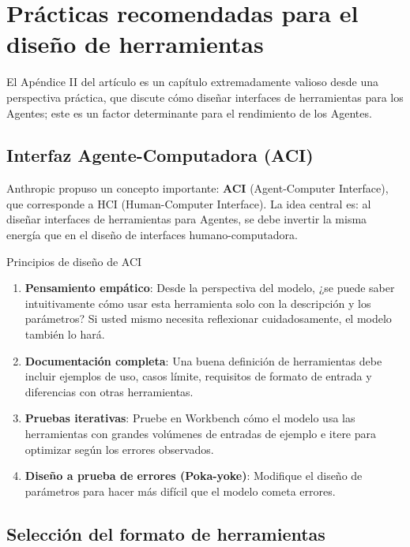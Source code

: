 \section{Prácticas recomendadas para el diseño de herramientas}

El Apéndice II del artículo es un capítulo extremadamente valioso desde una perspectiva práctica, que discute cómo diseñar interfaces de herramientas para los Agentes; este es un factor determinante para el rendimiento de los Agentes.

\subsection{Interfaz Agente-Computadora (ACI)}

Anthropic propuso un concepto importante: \textbf{ACI} (Agent-Computer Interface), que corresponde a HCI (Human-Computer Interface). La idea central es: al diseñar interfaces de herramientas para Agentes, se debe invertir la misma energía que en el diseño de interfaces humano-computadora.

\begin{importantbox}{Principios de diseño de ACI}
\begin{enumerate}
    \item \textbf{Pensamiento empático}: Desde la perspectiva del modelo, ¿se puede saber intuitivamente cómo usar esta herramienta solo con la descripción y los parámetros? Si usted mismo necesita reflexionar cuidadosamente, el modelo también lo hará.
    \item \textbf{Documentación completa}: Una buena definición de herramientas debe incluir ejemplos de uso, casos límite, requisitos de formato de entrada y diferencias con otras herramientas.
    \item \textbf{Pruebas iterativas}: Pruebe en Workbench cómo el modelo usa las herramientas con grandes volúmenes de entradas de ejemplo e itere para optimizar según los errores observados.
    \item \textbf{Diseño a prueba de errores (Poka-yoke)}: Modifique el diseño de parámetros para hacer más difícil que el modelo cometa errores.
\end{enumerate}
\end{importantbox}

\subsection{Selección del formato de herramientas}

